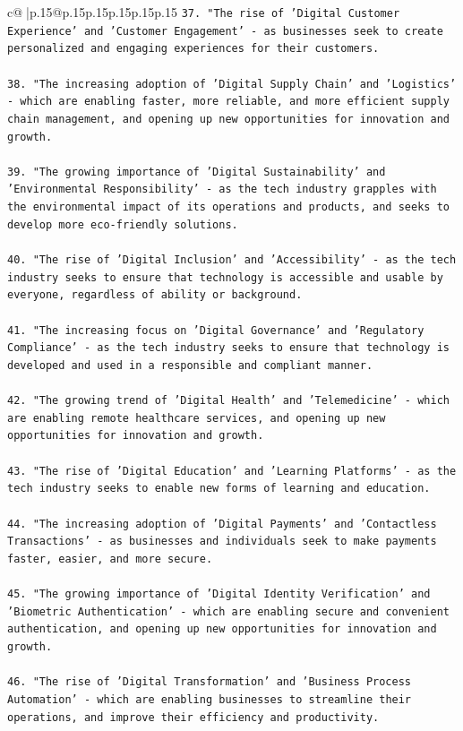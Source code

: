 \documentclass{article}
\begin{document}
{\begin{supertabular}{c@{$\;$}|p{.15\linewidth}@{}p{.15\linewidth}p{.15\linewidth}p{.15\linewidth}p{.15\linewidth}p{.15\linewidth}}
{{{\texttt{37. "The rise of 'Digital Customer Experience' and 'Customer Engagement' {-} as businesses seek to create personalized and engaging experiences for their customers.} \\
\\ 
\texttt{38. "The increasing adoption of 'Digital Supply Chain' and 'Logistics' {-} which are enabling faster, more reliable, and more efficient supply chain management, and opening up new opportunities for innovation and growth.} \\
\\ 
\texttt{39. "The growing importance of 'Digital Sustainability' and 'Environmental Responsibility' {-} as the tech industry grapples with the environmental impact of its operations and products, and seeks to develop more eco{-}friendly solutions.} \\
\\ 
\texttt{40. "The rise of 'Digital Inclusion' and 'Accessibility' {-} as the tech industry seeks to ensure that technology is accessible and usable by everyone, regardless of ability or background.} \\
\\ 
\texttt{41. "The increasing focus on 'Digital Governance' and 'Regulatory Compliance' {-} as the tech industry seeks to ensure that technology is developed and used in a responsible and compliant manner.} \\
\\ 
\texttt{42. "The growing trend of 'Digital Health' and 'Telemedicine' {-} which are enabling remote healthcare services, and opening up new opportunities for innovation and growth.} \\
\\ 
\texttt{43. "The rise of 'Digital Education' and 'Learning Platforms' {-} as the tech industry seeks to enable new forms of learning and education.} \\
\\ 
\texttt{44. "The increasing adoption of 'Digital Payments' and 'Contactless Transactions' {-} as businesses and individuals seek to make payments faster, easier, and more secure.} \\
\\ 
\texttt{45. "The growing importance of 'Digital Identity Verification' and 'Biometric Authentication' {-} which are enabling secure and convenient authentication, and opening up new opportunities for innovation and growth.} \\
\\ 
\texttt{46. "The rise of 'Digital Transformation' and 'Business Process Automation' {-} which are enabling businesses to streamline their operations, and improve their efficiency and productivity.} \\
}}}
\end{supertabular}}
\end{document}
